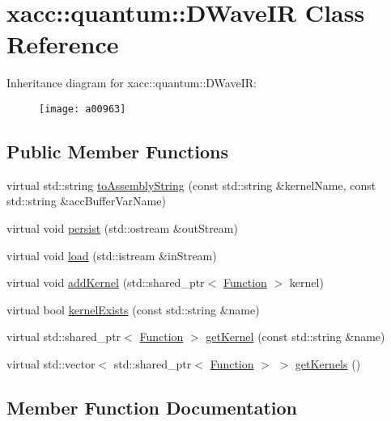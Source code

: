 \hypertarget{a00963}{}\section{xacc\+:\+:quantum\+:\+:D\+Wave\+IR Class Reference}
\label{a00963}
Inheritance diagram for xacc\+:\+:quantum\+:\+:D\+Wave\+IR\+:\begin{figure}[H]
\begin{center}
\leavevmode
\texttt{[image: a00963]}
\end{center}
\end{figure}
\subsection*{Public Member Functions}
\begin{DoxyCompactItemize}
\item 
virtual std\+::string \hyperlink{a00963_ac19ad098d5bbfe769809c10e26ebebc6}{to\+Assembly\+String} (const std\+::string \&kernel\+Name, const std\+::string \&acc\+Buffer\+Var\+Name)
\item 
virtual void \hyperlink{a00963_adac268c6fa2234902efeb9b3c07c0ac2}{persist} (std\+::ostream \&out\+Stream)
\item 
virtual void \hyperlink{a00963_a94d814172ec30c7ed32e6ab52bc2a41a}{load} (std\+::istream \&in\+Stream)
\item 
virtual void \hyperlink{a00963_a7e1ddff2771233dc45f60a6b7e15ef63}{add\+Kernel} (std\+::shared\+\_\+ptr$<$ \hyperlink{a01127}{Function} $>$ kernel)
\item 
virtual bool \hyperlink{a00963_ace9b8c6f4f29e32c8482fec4eacb637a}{kernel\+Exists} (const std\+::string \&name)
\item 
virtual std\+::shared\+\_\+ptr$<$ \hyperlink{a01127}{Function} $>$ \hyperlink{a00963_ac4295dfef98c94d7154a4fd39a6e5d1c}{get\+Kernel} (const std\+::string \&name)
\item 
virtual std\+::vector$<$ std\+::shared\+\_\+ptr$<$ \hyperlink{a01127}{Function} $>$ $>$ \hyperlink{a00963_accffbb279cb1f67e0fe79c603fe7a949}{get\+Kernels} ()
\end{DoxyCompactItemize}


\subsection{Member Function Documentation}
\mbox{\label{a00963_a7e1ddff2771233dc45f60a6b7e15ef63}} 
